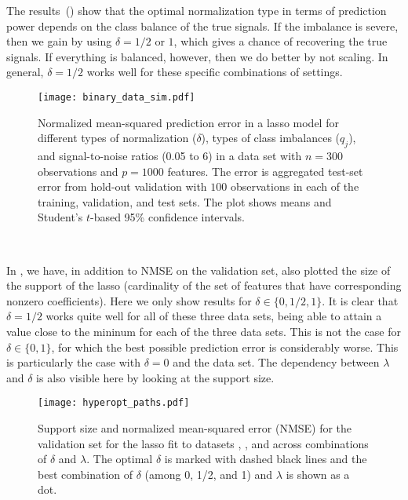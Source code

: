 The results~() show that the optimal normalization type in terms of
prediction power depends on the class balance of the true signals. If the imbalance is
severe, then we gain by using \(\delta=1/2\) or \(1\), which gives a chance of recovering
the true signals. If everything is balanced, however, then we do better by not scaling. In
general, \(\delta=1/2\) works well for these specific combinations of settings.

\begin{figure}[htpb]
  \centering
  \texttt{[image: binary\_data\_sim.pdf]}
  \caption{%
    Normalized mean-squared prediction error in a lasso model for different types of
    normalization (\(\delta\)), types of class imbalances (\(q_j\)), and signal-to-noise ratios
    (0.05 to 6) in a data set with \(n=300\) observations and \(p = \num{1000}\) features. The
    error is aggregated test-set error from hold-out validation with \(100\) observations in
    each of the training, validation, and test sets. The plot shows means and Student's
    \(t\)-based 95\% confidence intervals. } \label{fig:binary-sim}
\end{figure}

\

In , we have, in addition to NMSE on the validation set, also
plotted the size of the support of the lasso (cardinality of the set of features that have
corresponding nonzero coefficients). Here we only show results for \(\delta \in \{0, 1/2,
1\}\). It is clear that \(\delta = 1/2\) works quite well for all of these three data sets,
being able to attain a value close to the mininum for each of the three data sets. This is
not the case for \(\delta \in \{0, 1\}\), for which the best possible prediction error is
considerably worse. This is particularly the case with \(\delta =0\) and the 
data set. The dependency between \(\lambda\) and \(\delta\) is also visible here by looking
at the support size.

\begin{figure}[htpb]
  \centering
  \texttt{[image: hyperopt\_paths.pdf]}
  \caption{%
    Support size and normalized mean-squared error (NMSE) for the validation set for the lasso
    fit to datasets , , and  across combinations of
    \(\delta\) and \(\lambda\). The optimal \(\delta\) is marked with dashed black lines and
    the best combination of \(\delta\) (among 0, 1/2, and 1) and \(\lambda\) is shown as a dot.
  }
  \label{fig:hyperopt-support}
\end{figure}

